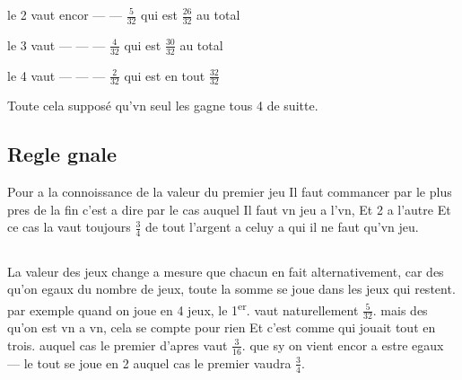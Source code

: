 \documentclass[11pt,a4paper]{article}
\begin{document}
le 2 vaut encor — — $\frac{5}{32}$ qui est $\frac{26}{32}$ au total

le 3 vaut — — — $\frac{4}{32}$ qui est $\frac{30}{32}$ au total

le 4 vaut — — — $\frac{2}{32}$ qui est en tout $\frac{32}{32}$

Toute cela supposé qu'vn seul les gagne tous 4 de suitte.

\subsection*{Regle gnale}

Pour  a la connoissance de la valeur du premier jeu Il faut commancer par le plus pres de la fin c'est a dire par le cas auquel Il faut vn jeu a l'vn, Et 2 a l'autre Et ce cas la vaut toujours $\frac{3}{4}$ de tout l'argent a celuy a qui il ne faut qu'vn jeu.

\subsection*{}

La valeur des jeux change a mesure que chacun en fait alternativement, car des qu'on  egaux  du nombre de jeux, toute la somme se joue dans les jeux qui restent. par exemple quand on joue en 4 jeux, le 1\textsuperscript{er}. vaut naturellement $\frac{5}{32}$. mais des qu'on est vn a vn, cela se compte pour rien Et c'est comme qui jouait tout en trois. auquel cas le premier d'apres vaut $\frac{3}{16}$. que sy on vient encor a estre egaux — le tout se joue en 2 auquel cas le premier vaudra $\frac{3}{4}$.
\end{document}
